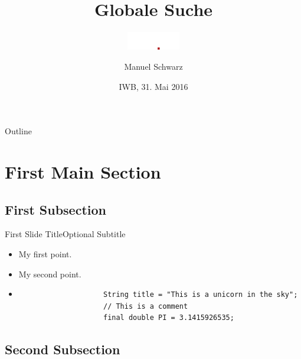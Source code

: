 \documentclass{beamer}
\title{Globale Suche}
\subtitle{\includegraphics[height=8mm]{../img/studip-logo@2x}}
\author{Manuel Schwarz}
\institute[Uni Osnabrück]{\inst{} virtUOS\\ Universität Osnabrück}
\date{IWB, 31. Mai 2016}
\begin{document}
\begin{frame}
    \titlepage
\end{frame}


\begin{frame}{Outline}
    \tableofcontents
\end{frame}

\section{First Main Section}

\subsection{First Subsection}

\begin{frame}[fragile]{First Slide Title}{Optional Subtitle}
    \begin{itemize}
        \item {My first point.\pause}
        \item {My second point.\pause}
        \item[]{\begin{verbatim}
                    String title = "This is a unicorn in the sky";
                    // This is a comment
                    final double PI = 3.1415926535;
                \end{verbatim}
        }
    \end{itemize}
\end{frame}

\subsection{Second Subsection}
\end{document}
